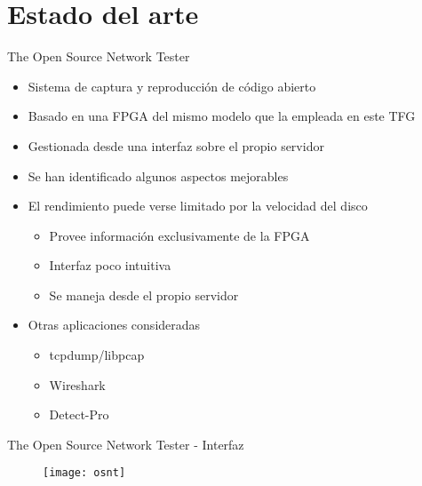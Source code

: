 \section{Estado del arte}

\begin{frame}{The Open Source Network Tester}
  \begin{itemize}
    \item Sistema de captura y reproducción de código abierto
    \item Basado en una FPGA del mismo modelo que la empleada en este TFG
    \item Gestionada desde una interfaz sobre el propio servidor
    \item Se han identificado algunos aspectos mejorables
    \item El rendimiento puede verse limitado por la velocidad del disco
    \begin{itemize}
      \item Provee información exclusivamente de la FPGA
      \item Interfaz poco intuitiva
      \item Se maneja desde el propio servidor
    \end{itemize}
    \item Otras aplicaciones consideradas
    \begin{itemize}
      \item tcpdump/libpcap
      \item Wireshark
      \item Detect-Pro
    \end{itemize}
  \end{itemize}
\end{frame}

\begin{frame}{The Open Source Network Tester - Interfaz}
  \begin{figure}
    \texttt{[image: osnt]}
  \end{figure}
\end{frame}
